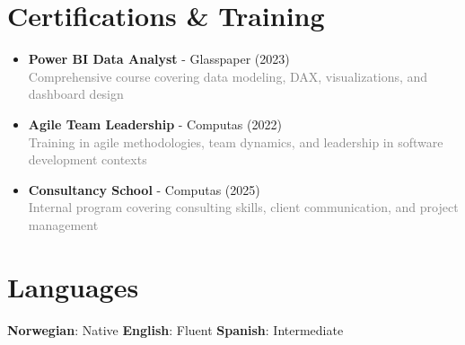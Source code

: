 \documentclass[11pt,a4paper]{article}
\begin{document}
\section{Certifications \& Training}

\begin{itemize}[itemsep=0.5em, leftmargin=*]
\item \textbf{Power BI Data Analyst} - Glasspaper (2023)\\
\textcolor{gray}{Comprehensive course covering data modeling, DAX, visualizations, and dashboard design}
\item \textbf{Agile Team Leadership} - Computas (2022)\\
\textcolor{gray}{Training in agile methodologies, team dynamics, and leadership in software development contexts}
\item \textbf{Consultancy School} - Computas (2025)\\
\textcolor{gray}{Internal program covering consulting skills, client communication, and project management}
\end{itemize}

\vspace{10pt}

\section{Languages}
\textbf{Norwegian}: Native \quad \textbf{English}: Fluent \quad \textbf{Spanish}: Intermediate
\end{document}
